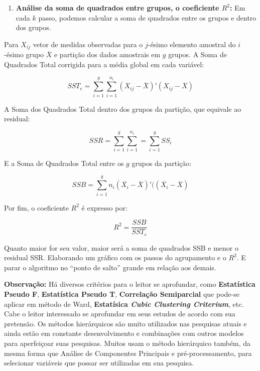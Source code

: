 \documentclass[
  openany]{book}
\providecommand{\tightlist}{%
  \setlength{\itemsep}{0pt}\setlength{\parskip}{0pt}}
\begin{document}
\begin{enumerate}
\def\labelenumi{\arabic{enumi}.}
\setcounter{enumi}{2}
\tightlist
\item
  \textbf{Análise da soma de quadrados entre grupos, o coeficiente \(R^2\):} Em cada \(k\) passo, podemos calcular a soma de quadrados entre os grupos e dentro dos grupos.
\end{enumerate}

Para \(X_{ij}\) vetor de medidas observadas para o \(j\)-ésimo elemento amostral do \(i\)-ésimo grupo \(\overline{X}\) e partição dos dados amostrais em \(g\) grupos. A Soma de Quadrados Total corrigida para a média global em cada variável:

\begin{equation}
SST_c=\displaystyle \sum^{g}_{i=1} \sum^{n_i}_{i=1} (X_{ij}-\overline{X})'(X_{ij}-\overline{X})
 \label{eq:sstc}
\end{equation}

A Soma dos Quadrados Total dentro dos grupos da partição, que equivale ao residual:

\begin{equation}
SSR=\displaystyle \sum^{g}_{i=1} \sum^{n_i}_{i=1} = \sum^{g}_{i=1}SS_i
 \label{eq:ssrc}
\end{equation}

E a Soma de Quadrados Total entre os \(g\) grupos da partição:

\begin{equation}
SSB=\displaystyle \sum^{g}_{i=1} n_i (\overline{X_{i}}-\overline{X})'((\overline{X_{i}}-\overline{X})
 \label{eq:ssbc}
\end{equation}

Por fim, o coeficiente \(R^2\) é expresso por:

\begin{equation}
R^2=\frac{SSB}{SST_c}
 \label{eq:rsquarec}
\end{equation}

Quanto maior for seu valor, maior será a soma de quadrados SSB e menor o residual SSR. Elaborando um gráfico com os passos do agrupamento e o \(R^2\). E parar o algoritmo no ``ponto de salto'' grande em relação aos demais.

\textbf{Observação:} Há diversos critérios para o leitor se aprofundar, como \textbf{Estatística Pseudo F}, \textbf{Estatística Pseudo T}, \textbf{Correlação Semiparcial} que pode-se aplicar em método de Ward, \textbf{Estatísica \emph{Cubic Clustering Criterium}}, etc. Cabe o leitor interessado se aprofundar em seus estudos de acordo com sua pretensão. Os métodos hierárquicos são muito utilizados nas pesquisas atuais e ainda estão em constante desenvolvimento e combinações com outros modelos para aperfeiçoar suas pesquisas. Muitos usam o método hierárquico também, da mesma forma que Análise de Componentes Principais e pré-processamento, para selecionar variáveis que possar ser utilizadas em sua pesquisa.
\end{document}
